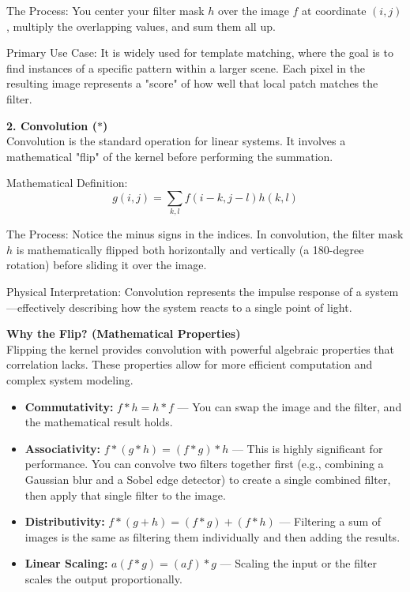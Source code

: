 \documentclass[12pt]{article}
\begin{document}
The Process: You center your filter mask $h$ over the image $f$ at coordinate $(i,j)$, multiply the overlapping values, and sum them all up.

Primary Use Case: It is widely used for template matching, where the goal is to find instances of a specific pattern within a larger scene. Each pixel in the resulting image represents a "score" of how well that local patch matches the filter.

\textbf{2. Convolution ($*$)}\\
Convolution is the standard operation for linear systems. It involves a mathematical "flip" of the kernel before performing the summation.

Mathematical Definition:
\[
    g(i,j) = \sum_{k,l} f(i-k, j-l)h(k,l)
\]

The Process: Notice the minus signs in the indices. In convolution, the filter mask $h$ is mathematically flipped both horizontally and vertically (a 180-degree rotation) before sliding it over the image.

Physical Interpretation: Convolution represents the impulse response of a system—effectively describing how the system reacts to a single point of light.

\textbf{Why the Flip? (Mathematical Properties)}\\
Flipping the kernel provides convolution with powerful algebraic properties that correlation lacks. These properties allow for more efficient computation and complex system modeling.

\begin{itemize}
    \item \textbf{Commutativity:} $f * h = h * f$ — You can swap the image and the filter, and the mathematical result holds.
    \item \textbf{Associativity:} $f * (g * h) = (f * g) * h$ — This is highly significant for performance. You can convolve two filters together first (e.g., combining a Gaussian blur and a Sobel edge detector) to create a single combined filter, then apply that single filter to the image.
    \item \textbf{Distributivity:} $f * (g + h) = (f * g) + (f * h)$ — Filtering a sum of images is the same as filtering them individually and then adding the results.
    \item \textbf{Linear Scaling:} $a(f * g) = (af) * g$ — Scaling the input or the filter scales the output proportionally.
\end{itemize}
\end{document}
